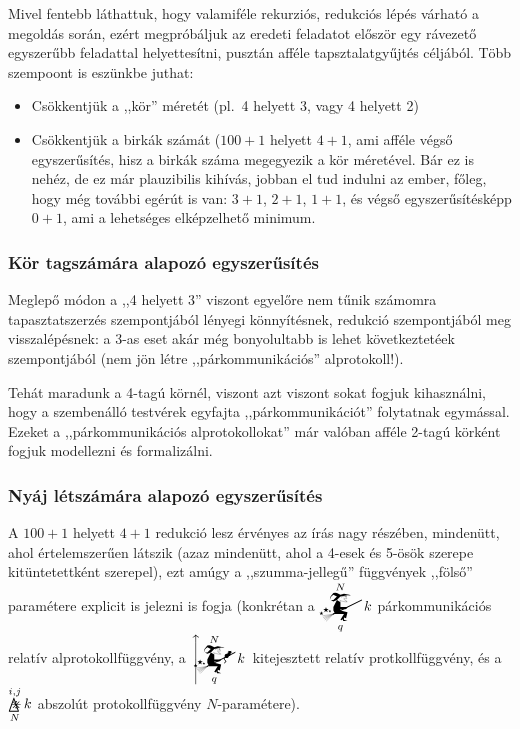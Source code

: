 \documentclass{article}
\newcommand{\mainfuncomm}[3]{\mathwitch_{#2}^{#1}#3}
\newcommand{\mainfunext}[3]{\left\uparrow\!\!\!\mathwitch*_{#2}^{#1}#3\right.}
\begin{document}
	Mivel fentebb láthattuk, hogy valamiféle rekurziós, redukciós lépés várható a megoldás során, ezért megpróbáljuk az eredeti feladatot először egy rávezető egyszerűbb feladattal helyettesítni, pusztán afféle tapsztalatgyűjtés céljából. Több szempoont is eszünkbe juthat: 

	\begin{itemize}
		\item Csökkentjük a ,,kör'' méretét (pl.~4 helyett 3, vagy 4 helyett 2)
		\item Csökkentjük a birkák számát ($100 + 1$ helyett $4 +1$, ami afféle végső egyszerűsítés, hisz a birkák száma megegyezik a kör méretével. Bár ez is nehéz, de ez már plauzibilis kihívás, jobban el tud indulni az ember, főleg, hogy még további egérút is van: $3 +1$, $2 + 1$, $1 + 1$, és végső egyszerűsítésképp $0 + 1$, ami a lehetséges elképzelhető minimum.
	\end{itemize}

	\subsubsection{Kör tagszámára alapozó egyszerűsítés}

	Meglepő módon a ,,4 helyett 3'' viszont egyelőre nem tűnik számomra tapasztatszerzés szempontjából  lényegi könnyítésnek, redukció szempontjából meg  visszalépésnek: a 3-as eset akár még bonyolultabb is lehet következtetéek szempontjából (nem jön létre ,,párkommunikációs'' alprotokoll!).

	Tehát maradunk a 4-tagú körnél, viszont azt viszont sokat fogjuk kihasználni, hogy a szembenálló testvérek egyfajta ,,párkommunikációt'' folytatnak egymással. Ezeket a ,,párkommunikációs alprotokollokat'' már valóban afféle 2-tagú körként fogjuk modellezni és formalizálni.%


	\subsubsection{Nyáj létszámára alapozó egyszerűsítés}

	A $100 + 1$ helyett $4 + 1$ redukció lesz érvényes az írás nagy részében, mindenütt, ahol értelemszerűen látszik (azaz mindenütt, ahol a 4-esek és 5-ösök szerepe kitüntetettként szerepel), ezt amúgy a ,,szumma-jellegű'' függvények ,,fölső'' paramétere explicit is jelezni is fogja (konkrétan a $\displaystyle\mainfuncomm Nqk$ párkommunikációs relatív alprotokollfüggvény, a $\displaystyle\mainfunext Nqk$ kitejesztett relatív protkollfüggvény, és a $\mathop{\bigtriangleup\mspace{-14.607mu}\divideontimes}\limits_N^{i,j}k$ abszolút protokollfüggvény $N$-paramétere).
\end{document}
